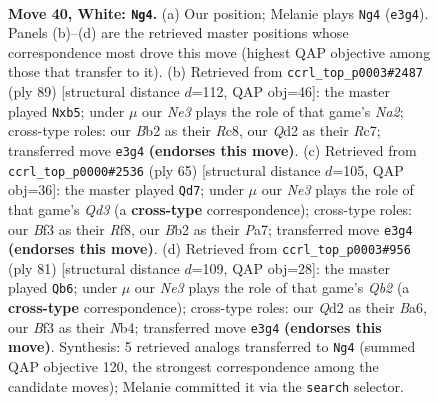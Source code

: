 \documentclass[11pt]{article}
\begin{document}
\clearpage

\begin{figure}[p]\centering
\begin{subfigure}{0.46\textwidth}\centering
\resizebox{\linewidth}{!}{%
\newchessgame
\chessboard[
  setfen={1n1qkbr1/4n3/r1p3p1/3p2P1/3P1P1p/1P2NB1P/1B1Q3R/2R3K1 w - - 9 40},
  showmover=false,
  pgfstyle=straightmove, color=movearrow, markmove={e3-g4}
]}
\caption{}
\end{subfigure}\hfill
\begin{subfigure}{0.46\textwidth}\centering
\resizebox{\linewidth}{!}{%
\newchessgame
\chessboard[
  setfen={2r4k/n1r1qbp1/7p/pP1pPp1P/3P1P2/1P5R/3RN1K1/3Q1B2 b - - 0 45},
  showmover=false,
  pgfstyle=straightmove, color=movearrow, markmove={a7-b5}
]}
\caption{}
\end{subfigure}
\\[4pt]
\begin{subfigure}{0.46\textwidth}\centering
\resizebox{\linewidth}{!}{%
\newchessgame
\chessboard[
  setfen={1r3rk1/p3b2p/3qp1p1/2p5/8/1PNPRN1P/P3QPP1/6K1 b - - 4 33},
  showmover=false,
  pgfstyle=straightmove, color=movearrow, markmove={d6-d7}
]}
\caption{}
\end{subfigure}\hfill
\begin{subfigure}{0.46\textwidth}\centering
\resizebox{\linewidth}{!}{%
\newchessgame
\chessboard[
  setfen={r7/1q2kp2/b2p3b/p2Pp2P/1n2P3/1PN3R1/3R4/1KNQ4 b - - 1 41},
  showmover=false,
  pgfstyle=straightmove, color=movearrow, markmove={b7-b6}
]}
\caption{}
\end{subfigure}
\caption{\textbf{Move 40, White: \texttt{Ng4}.} (a) Our position; Melanie plays \texttt{Ng4} (\texttt{e3g4}). Panels (b)--(d) are the retrieved master positions whose correspondence most drove this move (highest QAP objective among those that transfer to it). (b) Retrieved from \texttt{ccrl\_top\_p0003\#2487} (ply 89) [structural distance $d$=112, QAP obj=46]: the master played \texttt{Nxb5}; under $\mu$ our \emph{Ne3} plays the role of that game's \emph{Na2}; cross-type roles: our \emph{B}b2 as their \emph{R}c8, our \emph{Q}d2 as their \emph{R}c7; transferred move \texttt{e3g4} \textbf{(endorses this move)}. (c) Retrieved from \texttt{ccrl\_top\_p0000\#2536} (ply 65) [structural distance $d$=105, QAP obj=36]: the master played \texttt{Qd7}; under $\mu$ our \emph{Ne3} plays the role of that game's \emph{Qd3} (a \textbf{cross-type} correspondence); cross-type roles: our \emph{B}f3 as their \emph{R}f8, our \emph{B}b2 as their \emph{P}a7; transferred move \texttt{e3g4} \textbf{(endorses this move)}. (d) Retrieved from \texttt{ccrl\_top\_p0003\#956} (ply 81) [structural distance $d$=109, QAP obj=28]: the master played \texttt{Qb6}; under $\mu$ our \emph{Ne3} plays the role of that game's \emph{Qb2} (a \textbf{cross-type} correspondence); cross-type roles: our \emph{Q}d2 as their \emph{B}a6, our \emph{B}f3 as their \emph{N}b4; transferred move \texttt{e3g4} \textbf{(endorses this move)}. Synthesis: 5 retrieved analogs transferred to \texttt{Ng4} (summed QAP objective 120, the strongest correspondence among the candidate moves); Melanie committed it via the \texttt{search} selector.}
\label{fig:thought-m78}
\end{figure}
\end{document}
